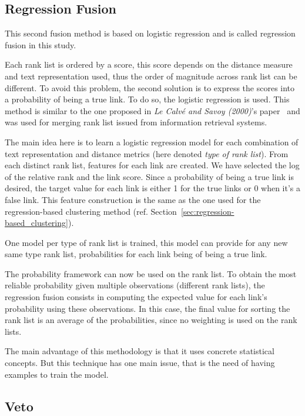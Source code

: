\subsection{Regression Fusion \label{sec:regression_fusion}}

This second fusion method is based on logistic regression and is called regression fusion in this study.

Each rank list is ordered by a score, this score depends on the distance measure and text representation used, thus the order of magnitude across rank list can be different.
To avoid this problem, the second solution is to express the scores into a probability of being a true link.
To do so, the logistic regression is used.
This method is similar to the one proposed in \textit{Le Calvé and Savoy (2000)}'s paper~\cite{le_calve_database_merging} and was used for merging rank list issued from information retrieval systems.

The main idea here is to learn a logistic regression model for each combination of text representation and distance metrics (here denoted \textit{type of rank list}).
From each distinct rank list, features for each link are created.
We have selected the log of the relative rank and the link score.
Since a probability of being a true link is desired, the target value for each link is either 1 for the true links or 0 when it's a false link.
This feature construction is the same as the one used for the regression-based clustering method (ref. Section~\ref{sec:regression-based_clustering}).

One model per type of rank list is trained, this model can provide for any new same type rank list, probabilities for each link being of being a true link.

The probability framework can now be used on the rank list.
To obtain the most reliable probability given multiple observations (different rank lists), the regression fusion consists in computing the expected value for each link's probability using these observations.
In this case, the final value for sorting the rank list is an average of the probabilities, since no weighting is used on the rank lists.

The main advantage of this methodology is that it uses concrete statistical concepts.
But this technique has one main issue, that is the need of having examples to train the model.

\subsection{Veto}

